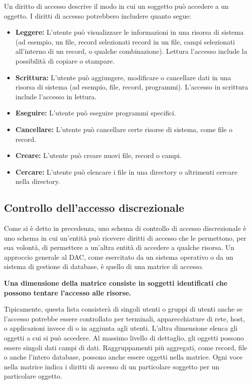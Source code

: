 Un diritto di accesso descrive il modo in cui un soggetto può accedere a un oggetto.
\singlespacing
I diritti di accesso potrebbero includere quanto segue:
\begin{itemize}
    \item \textbf{Leggere:} L'utente può visualizzare le informazioni in una risorsa di sistema (ad esempio, un file, record selezionati record in un file, campi selezionati all'interno di un record, o qualche combinazione). Lettura l'accesso include la possibilità di copiare o stampare.
    
    \item \textbf{Scrittura:} L'utente può aggiungere, modificare o cancellare dati in una risorsa di sistema (ad esempio, file, record, programmi). L'accesso in scrittura include l'accesso in lettura.
    
    \item \textbf{Eseguire:} L'utente può eseguire programmi specifici.
    
    \item \textbf{Cancellare:} L'utente può cancellare certe risorse di sistema, come file o record.
    
    \item \textbf{Creare:} L'utente può creare nuovi file, record o campi.
    
    \item \textbf{Cercare:} L'utente può elencare i file in una directory o altrimenti cercare nella directory.
\end{itemize}
\subsection{Controllo dell'accesso discrezionale}
Come si è detto in precedenza, uno schema di controllo di accesso discrezionale è uno schema in cui un'entità può ricevere diritti di accesso che le permettono, per sua volontà, di permettere a un'altra entità di accedere a qualche risorsa. Un approccio generale al DAC, come esercitato da un sistema operativo o da un sistema di gestione di database, è quello di una matrice di accesso.
\begin{center}
    \textbf{Una dimensione della matrice consiste in soggetti identificati che possono tentare l'accesso alle risorse.}
\end{center}
Tipicamente, questa lista consisterà di singoli utenti o gruppi di utenti anche se l'accesso potrebbe essere controllato per terminali, apparecchiature di rete, host, o applicazioni invece di o in aggiunta agli utenti. L'altra dimensione elenca gli oggetti a cui si può accedere. Al massimo livello di dettaglio, gli oggetti possono essere singoli dati campi di dati. Raggruppamenti più aggregati, come record, file o anche l'intero database, possono anche essere oggetti nella matrice. Ogni voce nella matrice indica i diritti di accesso di un particolare soggetto per un particolare oggetto.

